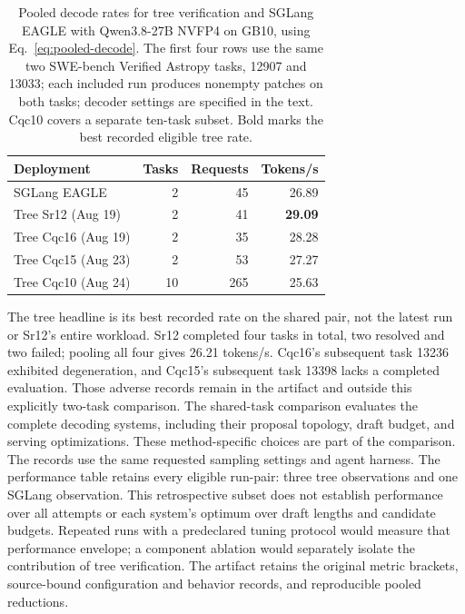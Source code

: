 \begin{table}[t]
\caption{Pooled decode rates for tree verification and SGLang EAGLE with Qwen3.8-27B NVFP4 on GB10, using Eq.~\ref{eq:pooled-decode}. The first four rows use the same two SWE-bench Verified Astropy tasks, 12907 and 13033; each included run produces nonempty patches on both tasks; decoder settings are specified in the text. Cqc10 covers a separate ten-task subset. Bold marks the best recorded eligible tree rate.}
\label{tab:pooled-decode}
\centering\small
\begin{tabular}{@{}lrrr@{}}
\toprule
Deployment & Tasks & Requests & Tokens/s \\
\midrule
SGLang EAGLE & 2 & 45 & 26.89 \\
Tree Sr12 (Aug 19) & 2 & 41 & \textbf{29.09} \\
Tree Cqc16 (Aug 19) & 2 & 35 & 28.28 \\
Tree Cqc15 (Aug 23) & 2 & 53 & 27.27 \\
\midrule
Tree Cqc10 (Aug 24) & 10 & 265 & 25.63 \\
\bottomrule
\end{tabular}
\end{table}

The tree headline is its best recorded rate on the shared pair, not the latest run or Sr12's entire workload. Sr12 completed four tasks in total, two resolved and two failed; pooling all four gives 26.21 tokens/s. Cqc16's subsequent task 13236 exhibited degeneration, and Cqc15's subsequent task 13398 lacks a completed evaluation. Those adverse records remain in the artifact and outside this explicitly two-task comparison. The shared-task comparison evaluates the complete decoding systems, including their proposal topology, draft budget, and serving optimizations. These method-specific choices are part of the comparison. The records use the same requested sampling settings and agent harness. The performance table retains every eligible run-pair: three tree observations and one SGLang observation. This retrospective subset does not establish performance over all attempts or each system's optimum over draft lengths and candidate budgets. Repeated runs with a predeclared tuning protocol would measure that performance envelope; a component ablation would separately isolate the contribution of tree verification. The artifact retains the original metric brackets, source-bound configuration and behavior records, and reproducible pooled reductions.


